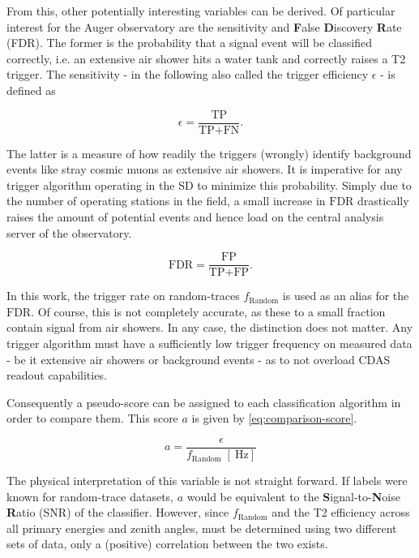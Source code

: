 From this, other potentially interesting variables can be derived. Of particular interest for the Auger observatory are the sensitivity and \textbf{F}alse 
\textbf{D}iscovery \textbf{R}ate (FDR). The former is the probability that a signal event will be classified correctly, i.e. an extensive air shower hits a 
water tank and correctly raises a T2 trigger. The sensitivity - in the following also called the trigger efficiency $\epsilon$ - is defined as

\begin{equation}
	\label{eq:statistics-efficiency}
	\epsilon = \frac{\text{TP}}{\text{TP} + \text{FN}}.
\end{equation}

The latter is a measure of how readily the triggers (wrongly) identify background events like stray cosmic muons as extensive air showers. It is imperative 
for any trigger algorithm operating in the SD to minimize this probability. Simply due to the number of operating stations in the field, a small increase in 
$\text{FDR}$ drastically raises the amount of potential events and hence load on the central analysis server of the observatory.

\begin{equation}
	\label{eq:statistics-efficiency}
	\text{FDR} = \frac{\text{FP}}{\text{TP} + \text{FP}}.
\end{equation}

In this work, the trigger rate on random-traces $f_\text{Random}$ is used as an alias for the $\text{FDR}$. Of course, this is not completely accurate, as these 
to a small fraction contain signal from air showers. In any case, the distinction does not matter. Any trigger algorithm must have a sufficiently low trigger 
frequency on measured data - be it extensive air showers or background events - as to not overload CDAS readout capabilities.

Consequently a pseudo-score can be assigned to each classification algorithm in order to compare them. This score $a$ is given by \autoref{eq:comparison-score}.

\begin{equation}
	\label{eq:comparison-score}
	a = \frac{\epsilon}{f_\text{Random}\;[\SI{}{\hertz}]}
\end{equation}

The physical interpretation of this variable is not straight forward. If labels were known for random-trace datasets, $a$ would be equivalent to the 
\textbf{S}ignal-to-\textbf{N}oise \textbf{R}atio (SNR) of the classifier. However, since $f_\text{Random}$ and the T2 efficiency across all primary energies and 
zenith angles, must be determined using two different sets of data, only a (positive) correlation between the two exists.

